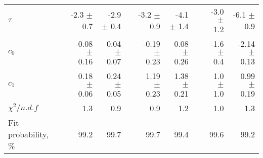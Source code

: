 \begin{table}[H]
{{\begin{tabular}{lrrrrrrrrr}

    \rule{0pt}{4ex}$\tau$  && -2.3 $\pm$ 0.7 & -2.9 $\pm$ 0.4 && -3.2 $\pm$ 0.9 & -4.1 $\pm$ 1.4 && -3.0 $\pm$ 1.2 & -6.1 $\pm$ 0.9 \\
    $c_0$  && -0.08 $\pm$ 0.16 & 0.04 $\pm$ 0.07 && -0.19 $\pm$ 0.23 & 0.08 $\pm$ 0.26 && -1.6 $\pm$ 0.4 & -2.14 $\pm$ 0.13 \\
    $c_1$  && 0.18 $\pm$ 0.06 & 0.24 $\pm$ 0.05 && 1.19 $\pm$ 0.23 & 1.38 $\pm$ 0.21 && 1.0 $\pm$ 1.0 & 0.99 $\pm$ 0.19 \\


    \rule{0pt}{4ex}$\chi^2 / n.d.f$  && 1.3 & 0.9 && 0.9 & 1.2 && 1.0 & 1.3 \\
    Fit probability, \%  && 99.2 & 99.7 && 99.7 & 99.4 && 99.6 & 99.2 \\
    \bottomrule
\end{tabular}
}
}
\label{tab:chib:ups1s:fits}
\end{table}